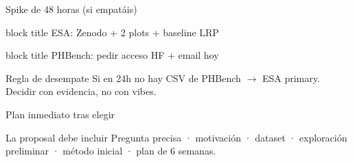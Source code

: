 \documentclass[aspectratio=169,10pt]{beamer}
\begin{document}
\begin{frame}{Spike de 48 horas (si empatáis)}
  \noindent
  \begin{minipage}[t]{0.48\textwidth}
    \begin{beamercolorbox}[wd=\textwidth,rounded=true,sep=6pt,center]{block title}
      \scriptsize ESA: Zenodo + 2 plots + baseline LRP
    \end{beamercolorbox}
  \end{minipage}\hfill
  \begin{minipage}[t]{0.48\textwidth}
    \begin{beamercolorbox}[wd=\textwidth,rounded=true,sep=6pt,center]{block title}
      \scriptsize PHBench: pedir acceso HF + email hoy
    \end{beamercolorbox}
  \end{minipage}
  \vspace{0.45em}
  \begin{block}{Regla de desempate}
    Si en 24h no hay CSV de PHBench $\rightarrow$ ESA primary. Decidir con evidencia, no con vibes.
  \end{block}
\end{frame}

\begin{frame}{Plan inmediato tras elegir}
  \vspace{0.45em}
  \begin{block}{La proposal debe incluir}
    Pregunta precisa · motivación · dataset · exploración preliminar · método inicial · plan de 6 semanas.
  \end{block}
\end{frame}
\end{document}
